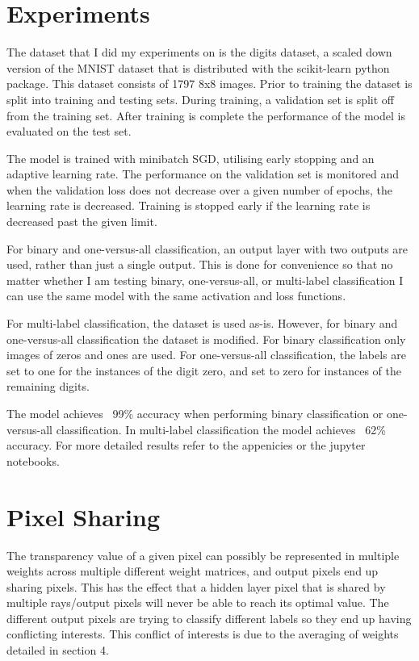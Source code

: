 \documentclass[]{article}
\begin{document}
\section{Experiments}
The dataset that I did my experiments on is the digits dataset, a scaled down version of the MNIST dataset that is distributed with the scikit-learn python package. This dataset consists of 1797 8x8 images. Prior to training the dataset is split into training and testing sets. During training, a validation set is split off from the training set. After training is complete the performance of the model is evaluated on the test set.

The model is trained with minibatch SGD, utilising early stopping and an adaptive learning rate. 
The performance on the validation set is monitored and when the validation loss does not decrease over a given number of epochs, the learning rate is decreased. Training is stopped early if the learning rate is decreased past the given limit.

For binary and one-versus-all classification, an output layer with two outputs are used, rather than just a single output. This is done for convenience so that no matter whether I am testing binary, one-versus-all, or multi-label classification I can use the same model with the same activation and loss functions.

For multi-label classification, the dataset is used as-is. However, for binary and one-versus-all classification the dataset is modified. For binary classification only images of zeros and ones are used. For one-versus-all classification, the labels are set to one for the instances of the digit zero, and set to zero for instances of the remaining digits.

The model achieves ~99\% accuracy when performing binary classification or one-versus-all classification. In multi-label classification the model achieves ~62\% accuracy. For more detailed results refer to the appenicies or the jupyter notebooks.

\section{Pixel Sharing}
The transparency value of a given pixel can possibly be represented in multiple weights across multiple different weight matrices, and output pixels end up sharing pixels. This has the effect that a hidden layer pixel that is shared by multiple rays/output pixels will never be able to reach its optimal value. The different output pixels are trying to classify different labels so they end up having conflicting interests. This conflict of interests is due to the averaging of weights detailed in section 4.
\end{document}
